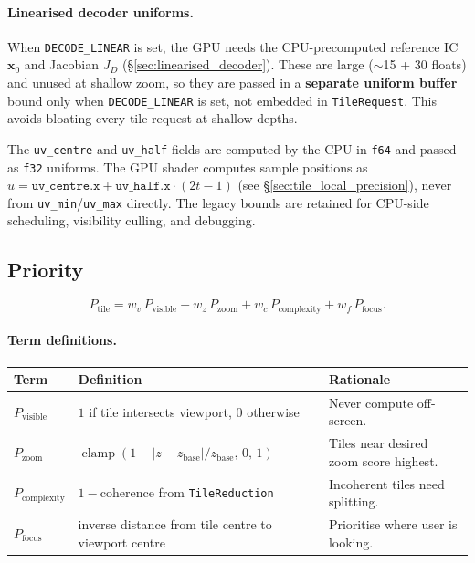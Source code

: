 \documentclass[11pt]{report}
\DeclareMathOperator{\clamp}{clamp}
\begin{document}
\paragraph{Linearised decoder uniforms.} When \texttt{DECODE\_LINEAR} is set, the GPU needs the CPU-precomputed reference IC $\mathbf x_0$ and Jacobian $J_D$ (\S\ref{sec:linearised_decoder}). These are large ($\sim$15 + 30 floats) and unused at shallow zoom, so they are passed in a \textbf{separate uniform buffer} bound only when \texttt{DECODE\_LINEAR} is set, not embedded in \texttt{TileRequest}. This avoids bloating every tile request at shallow depths.

The \texttt{uv\_centre} and \texttt{uv\_half} fields are computed by the CPU in \texttt{f64} and passed as \texttt{f32} uniforms. The GPU shader computes sample positions as $u=\texttt{uv\_centre.x}+\texttt{uv\_half.x}\cdot(2t-1)$ (see \S\ref{sec:tile_local_precision}), never from \texttt{uv\_min}/\texttt{uv\_max} directly. The legacy bounds are retained for CPU-side scheduling, visibility culling, and debugging.

\subsection{Priority}
\label{sec:priority}

\[
P_{\text{tile}}=w_v\, P_{\text{visible}}+w_z\, P_{\text{zoom}}+w_c\, P_{\text{complexity}}+w_f\, P_{\text{focus}}.
\]

\paragraph{Term definitions.}
\begin{center}
\begin{tabular}{lll}
\toprule
Term & Definition & Rationale \\
\midrule
$P_{\text{visible}}$ & $1$ if tile intersects viewport, $0$ otherwise & Never compute off-screen. \\
$P_{\text{zoom}}$ & $\clamp(1-|z-z_{\text{base}}|/z_{\text{base}},\,0,\,1)$ & Tiles near desired zoom score highest. \\
$P_{\text{complexity}}$ & $1-\text{coherence}$ from \texttt{TileReduction} & Incoherent tiles need splitting. \\
$P_{\text{focus}}$ & inverse distance from tile centre to viewport centre & Prioritise where user is looking. \\
\bottomrule
\end{tabular}
\end{center}
\end{document}
